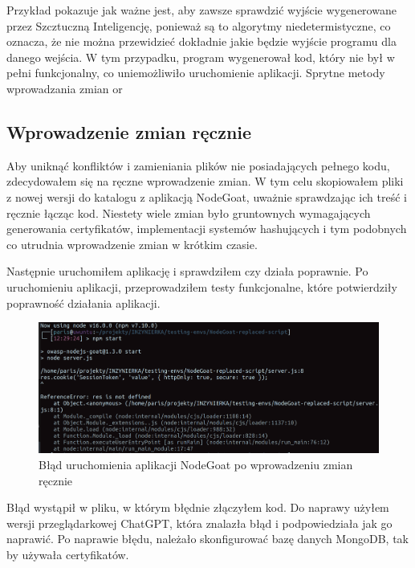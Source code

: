 Przykład pokazuje jak ważne jest, aby zawsze sprawdzić wyjście wygenerowane przez Szcztuczną Inteligencję, ponieważ są to algorytmy niedetermistyczne, co oznacza, że nie można przewidzieć dokładnie jakie będzie wyjście programu dla danego wejścia. W tym przypadku, program wygenerował kod, który nie był w pełni funkcjonalny, co uniemożliwiło uruchomienie aplikacji. Sprytne metody wprowadzania zmian or

\subsection{Wprowadzenie zmian ręcznie}
Aby uniknąć konfliktów i zamieniania plików nie posiadających pełnego kodu, zdecydowałem się na ręczne wprowadzenie zmian. W tym celu skopiowałem pliki z nowej wersji do katalogu z aplikacją NodeGoat, uważnie sprawdzając ich treść i ręcznie łącząc kod. Niestety wiele zmian było gruntownych wymagających generowania certyfikatów, implementacji systemów hashujących i tym podobnych co utrudnia wprowadzenie zmian w krótkim czasie.

Następnie uruchomiłem aplikację i sprawdziłem czy działa poprawnie. Po uruchomieniu aplikacji, przeprowadziłem testy funkcjonalne, które potwierdziły poprawność działania aplikacji. 

\begin{figure}[H]
  \centering
  \includegraphics[width=\linewidth]{img/npm-start-error.png}
  \caption{Błąd uruchomienia aplikacji NodeGoat po wprowadzeniu zmian ręcznie}
  \label{fig:nodegoat-error-manual}
\end{figure}

Błąd wystąpił w pliku, w którym błędnie złączyłem kod. Do naprawy użyłem wersji przeglądarkowej ChatGPT, która znalazła błąd i podpowiedziała jak go naprawić. Po naprawie błędu, należało skonfigurować bazę danych MongoDB, tak by używała certyfikatów.

